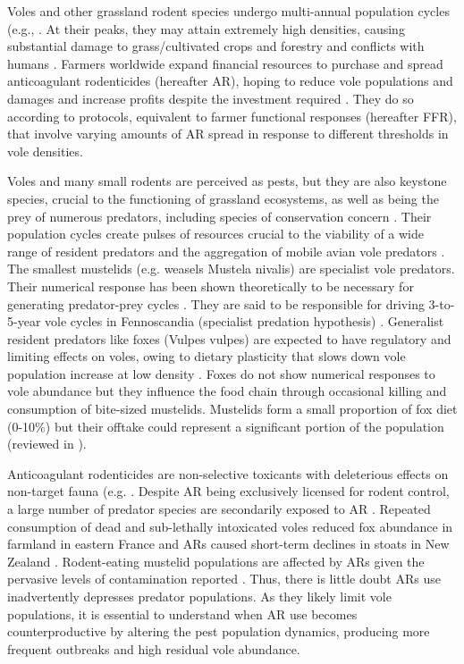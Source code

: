 \documentclass[11pt]{article}
\begin{document}
Voles and other grassland rodent species undergo multi-annual population cycles (e.g.,  \cite{Krebs2013}. At their peaks, they may attain extremely high densities, causing substantial damage to grass/cultivated crops and forestry and conflicts with humans \citep{Delattre2009}. Farmers worldwide expand financial resources to purchase and spread anticoagulant rodenticides (hereafter AR), hoping to reduce vole populations and damages and increase profits despite the investment required \citep{Stenseth2003}. They do so according to protocols, equivalent to farmer functional responses (hereafter FFR), that involve varying amounts of AR spread in response to different thresholds in vole densities. 

Voles and many small rodents are perceived as pests, but they are also keystone species, crucial to the functioning of grassland ecosystems, as well as being the prey of numerous predators, including species of conservation concern \citep{Delibes-Mateos2011, Coeurdassier2014}. Their population cycles create pulses of resources crucial to the viability of a wide range of resident predators and the aggregation of mobile avian vole predators \citep{Korpimaki1991}. The smallest mustelids (e.g. weasels Mustela nivalis) are specialist vole predators. Their numerical response has been shown theoretically to be necessary for generating predator-prey cycles \citep{Hanski1991}. They are said to be responsible for driving 3-to-5-year vole cycles in Fennoscandia (specialist predation hypothesis) \citet{Hanski1991}. Generalist resident predators like foxes (Vulpes vulpes) are expected to have regulatory and limiting effects on voles, owing to dietary plasticity that slows down vole population increase at low density \citet{Hanski1991}. Foxes do not show numerical responses to vole abundance \citep{Weber2002} but they influence the food chain through occasional killing and consumption of bite-sized mustelids. Mustelids form a small proportion of fox diet (0-10\%) but their offtake could represent a significant portion of the population (reviewed in \citet{Lambin2017}).

Anticoagulant rodenticides are non-selective toxicants with deleterious effects on non-target fauna (e.g. \cite{Coeurdassier2014}. Despite AR being exclusively licensed for rodent control, a large number of predator species are secondarily exposed to AR \citep{Sanchez-Barbudo2012}. Repeated consumption of dead and sub-lethally intoxicated voles reduced fox abundance in farmland in eastern France \citep{Jacquot2013} and ARs caused short-term declines in stoats in New Zealand \citep{Alterio1996}. Rodent-eating mustelid populations are affected by ARs given the pervasive levels of contamination reported \citep{McDonald1998}. Thus, there is little doubt ARs use inadvertently depresses predator populations. As they likely limit vole populations, it is essential to understand when AR use becomes counterproductive by altering the pest population dynamics, producing more frequent outbreaks and high residual vole abundance.
\end{document}
